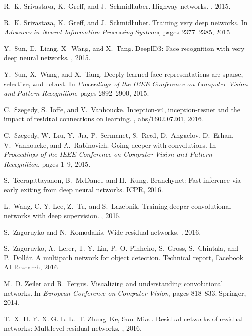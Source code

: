\documentclass[10pt,onecolumn,letterpaper]{article}
\begin{document}
\begin{thebibliography}{10}
R.~K. Srivastava, K.~Greff, and J.~Schmidhuber.
\newblock Highway networks.
, 2015.

R.~K. Srivastava, K.~Greff, and J.~Schmidhuber.
\newblock Training very deep networks.
\newblock In {\em Advances in Neural Information Processing Systems}, pages
  2377--2385, 2015.

Y.~Sun, D.~Liang, X.~Wang, and X.~Tang.
\newblock Deep{ID3}: Face recognition with very deep neural networks.
, 2015.

Y.~Sun, X.~Wang, and X.~Tang.
\newblock Deeply learned face representations are sparse, selective, and
  robust.
\newblock In {\em Proceedings of the IEEE Conference on Computer Vision and
  Pattern Recognition}, pages 2892--2900, 2015.

C.~Szegedy, S.~Ioffe, and V.~Vanhoucke.
\newblock Inception-v4, inception-resnet and the impact of residual connections
  on learning.
, abs/1602.07261, 2016.

C.~Szegedy, W.~Liu, Y.~Jia, P.~Sermanet, S.~Reed, D.~Anguelov, D.~Erhan,
  V.~Vanhoucke, and A.~Rabinovich.
\newblock Going deeper with convolutions.
\newblock In {\em Proceedings of the IEEE Conference on Computer Vision and
  Pattern Recognition}, pages 1--9, 2015.

S.~Teerapittayanon, B.~McDanel, and H.~Kung.
\newblock Branchynet: Fast inference via early exiting from deep neural
  networks.
\newblock ICPR, 2016.

L.~Wang, C.-Y. Lee, Z.~Tu, and S.~Lazebnik.
\newblock Training deeper convolutional networks with deep supervision.
, 2015.

S.~Zagoruyko and N.~Komodakis.
\newblock Wide residual networks.
, 2016.

S.~Zagoruyko, A.~Lerer, T.-Y. Lin, P.~O. Pinheiro, S.~Gross, S.~Chintala, and
  P.~Doll\'{a}r.
\newblock A multipath network for object detection.
\newblock Technical report, Facebook AI Research, 2016.

M.~D. Zeiler and R.~Fergus.
\newblock Visualizing and understanding convolutional networks.
\newblock In {\em European Conference on Computer Vision}, pages 818--833.
  Springer, 2014.

T.~X. H. Y. X. G. L. L.~T. Zhang~Ke, Sun~Miao.
\newblock Residual networks of residual networks: Multilevel residual networks.
, 2016.

\end{thebibliography}
\end{document}
